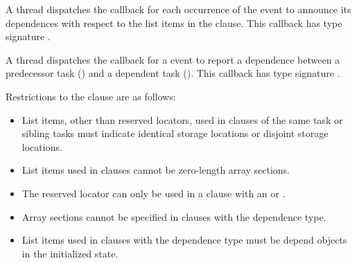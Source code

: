 \tools

A thread dispatches the  callback
for each occurrence of the  event to
announce its dependences with respect to the list items in the 
 clause. This callback has type signature
.

A thread dispatches the 
callback for a  event to report a
dependence between a predecessor task  () 
and a dependent task ().  This callback 
has type signature .

\restrictions
Restrictions to the  clause are as follows:

\begin{itemize}
\item List items,
      other than reserved locators,
      used in  clauses of the same task or sibling
      tasks
      must indicate identical storage locations or disjoint storage
      locations.
\item List items used in  clauses cannot be zero-length array sections.
\item The  reserved locator can only be used in a
       clause with an  or  .
\item Array sections cannot be specified in  clauses 
      with the  dependence type.
\item List items used in  clauses with the  
      dependence type must be depend objects in the initialized state.




\end{itemize}
